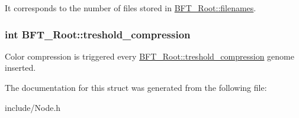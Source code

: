 It corresponds to the number of files stored in \hyperlink{structBFT__Root_a8022a504e2c0dd2d800efda892413ce7}{B\+F\+T\+\_\+\+Root\+::filenames}. \hypertarget{structBFT__Root_ac791b1bb0df480c8574095bf0444cc64}{}
\subsubsection[{treshold\+\_\+compression}]{\setlength{\rightskip}{0pt plus 5cm}int B\+F\+T\+\_\+\+Root\+::treshold\+\_\+compression}\label{structBFT__Root_ac791b1bb0df480c8574095bf0444cc64}


Color compression is triggered every \hyperlink{structBFT__Root_ac791b1bb0df480c8574095bf0444cc64}{B\+F\+T\+\_\+\+Root\+::treshold\+\_\+compression} genome inserted. 



The documentation for this struct was generated from the following file\+:\begin{DoxyCompactItemize}
\item 
include/Node.\+h\end{DoxyCompactItemize}
